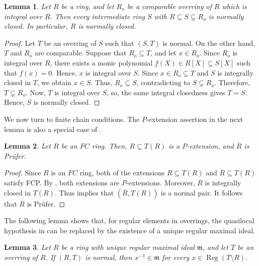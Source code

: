 \documentclass[12pt]{article}
\newtheorem{lemma}{Lemma}
\newcommand{\Reg}{\operatorname{Reg}}
\begin{document}
\begin{lemma}\label{integral-comparable-normally-closed}
    Let $R$ be a ring, and let $R_o$ be a comparable overring of $R$ which is integral over $R$. Then every intermediate ring $S$ with $R\subseteq S\subsetneq R_o$ is normally closed. In particular, $R$ is normally closed.
\end{lemma}
\begin{proof}
    Let $T$ be an overring of $S$ such that $(S,T)$ is normal. On the other hand, $T$ and $R_o$ are comparable. Suppose that $R_o\subseteq T$, and let $x\in R_o$. Since $R_o$ is integral over $R$, there exists a monic polynomial $f(X)\in R[X]\subseteq S[X]$ such that $f(x)=0$. Hence, $x$ is integral over $S$. Since $x\in R_o\subseteq T$ and $S$ is integrally closed in $T$, we obtain $x\in S$. Thus, $R_o\subseteq S$, contradicting to $S\subsetneq R_o$. Therefore, $T\subsetneq R_o$. Now, $T$ is integral over $S$, so, the same integral closedness gives $T=S$. Hence, $S$ is normally closed.
\end{proof}
	We now turn to finite chain conditions. The $P$-extension assertion in the next lemma is also a special case of \cite[Proposition 2.4]{dobbs-jarboui}.
	\begin{lemma}\label{fc-prufer-closure}
			Let $R$ be an $FC$ ring. Then, $R\subseteq T(R)$ is a $P$-extension, and $\overline R$ is Prüfer.
	\end{lemma}
	\begin{proof}
		Since $R$ is an $FC$ ring, both of the extensions $R\subseteq T(R)$ and $\overline R\subseteq T(R)$ satisfy FCP. By \cite[Proposition 2.4]{dobbs-jarboui}, both extensions are $P$-extensions. Moreover, $\overline R$ is integrally closed in $T(R)$. Thus \cite[Theorem 1]{normal-pairs} implies that $(\overline R,T(R))$ is a normal pair. It follows that $\overline R$ is Prüfer.
	\end{proof}
	The following lemma shows that, for regular elements in overrings, the quasilocal hypothesis in \cite[Lemma 1]{normal-pairs} can be replaced by the existence of a unique regular maximal ideal.
	\begin{lemma}\label{normal-regular-inverse}
		Let $R$ be a ring with unique regular maximal ideal $\mathfrak{m}$, and let $T$ be an overring of $R$. If $(R,T)$ is normal, then $x^{-1}\in\mathfrak{m}$ for every $x\in\Reg(T\setminus R)$.
	\end{lemma}
\end{document}

